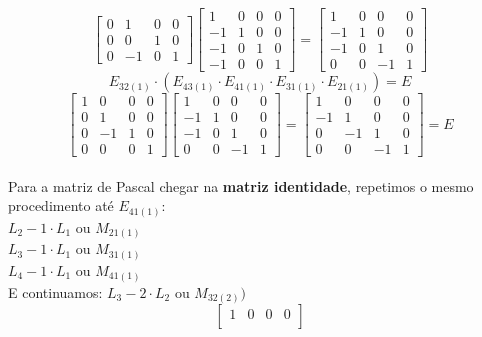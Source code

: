 \documentclass[leqno]{article}
\begin{document}
\begin{enumerate}
\begin{sol}
$$\begin{bmatrix}
			0 & 1 & 0 & 0\\
			0 & 0 & 1 & 0\\
			0 & -1 & 0 & 1
		\end{bmatrix}
		\begin{bmatrix}
			1 & 0 & 0 & 0\\
			-1 & 1 & 0 & 0\\
			-1 & 0 & 1 & 0\\
			-1 & 0 & 0 & 1
		\end{bmatrix} =
		\begin{bmatrix}
			1 & 0 & 0 & 0\\
			-1 & 1 & 0 & 0\\
			-1 & 0 & 1 & 0\\
			0 & 0 & -1 & 1
		\end{bmatrix}$$
		$$E_{32(1)} \cdot (E_{43(1)} \cdot E_{41(1)} \cdot E_{31(1)} \cdot E_{21(1)}) = E$$
		$$\begin{bmatrix}
			1 & 0 & 0 & 0\\
			0 & 1 & 0 & 0\\
			0 & -1 & 1 & 0\\
			0 & 0 & 0 & 1
		\end{bmatrix}
		\begin{bmatrix}
			1 & 0 & 0 & 0\\
			-1 & 1 & 0 & 0\\
			-1 & 0 & 1 & 0\\
			0 & 0 & -1 & 1
		\end{bmatrix} =
		\begin{bmatrix}
			1 & 0 & 0 & 0\\
			-1 & 1 & 0 & 0\\
			0 & -1 & 1 & 0\\
			0 & 0 & -1 & 1
		\end{bmatrix} = E$$\\
		Para a matriz de Pascal chegar na \textbf{matriz identidade}, repetimos o mesmo procedimento até $E_{41(1)}$:\\
		\newline
		$L_2 - 1 \cdot L_1$ ou $M_{21(1)}$ \\
		$L_3 - 1 \cdot L_1$ ou $M_{31(1)}$ \\
		$L_4 - 1 \cdot L_1$ ou $M_{41(1)}$ \\
		\newline
		E continuamos:
		$L_3 - 2 \cdot L_2$ ou $M_{32(2)})$ \\
		$$	\begin{bmatrix} 
			1 & 0 & 0 & 0 \\

\end{bmatrix}$$
\end{sol}
\end{enumerate}
\end{document}
